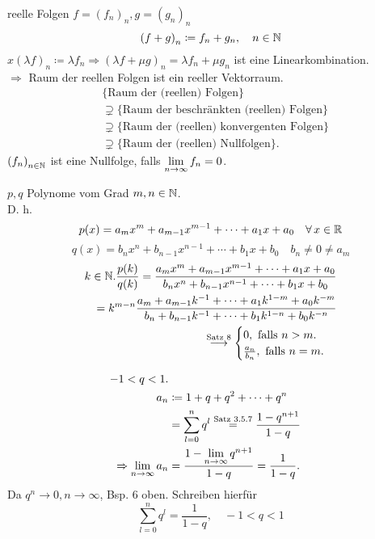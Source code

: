 \documentclass[../ana1.tex]{subfiles}
\begin{document}
reelle Folgen \(f = {(f_n)}_n, g = {(g_n)}_n \) \\
\[ {(f+g)}_n \coloneqq f_n + g_n, \quad n\in\mathbb{N} \]
\(x {(\lambda f)}_n \coloneqq \lambda f_n \Rightarrow {(\lambda f + \mu g)}_n = \lambda f_n + \mu g_n \) ist eine Linearkombination.\\
\(\Rightarrow{} \) Raum der reellen Folgen ist ein reeller Vektorraum.
\begin{align*}
	&\{ \text{Raum der (reellen) Folgen} \} \\
	&\supsetneq \{ \text{Raum der beschränkten (reellen) Folgen} \} \\
	&\supsetneq \{ \text{Raum der (reellen) konvergenten Folgen} \} \\
	&\supsetneq \{ \text{Raum der (reellen) Nullfolgen} \}.
\end{align*}
\({(f_n)}_{n\in\mathbb{N}} \) ist eine Nullfolge, falls \( \lim\limits_{n\rightarrow\infty} f_n = 0 \).

\begin{bsp}[1]
	\( p,q \) Polynome vom Grad \(m,n\in\mathbb{N} \).\\
	D. h. \[ p(x) = a_m x^m + a_{m-1} x^{m-1} + \cdots + a_1 x + a_0 \quad \forall x\in\R \]
	\[q(x) = b_n x^n + b_{n-1} x^{n-1} + \cdots + b_1 x + b_0 \quad b_n \neq 0 \neq a_m \]
	\begin{align*}
		k\in\mathbb{N}. \frac{p(k)}{q(k)} = \frac{a_m x^m + a_{m-1} x^{m-1} + \cdots + a_1 x + a_0}{b_n x^n + b_{n-1} x^{n-1} + \cdots + b_1 x + b_0}\\
		= k^{m-n} \frac{a_m + a_{m-1} k^{-1} + \cdots + a_1 k^{1-m} + a_0 k^{-m} }{b_n + b_{n-1} k^{-1} + \cdots + b_1 k^{1-n} + b_0 k^{-n}}\\
		\overset{\text{Satz 8}}{\longrightarrow}
		\begin{cases}
			0, \text{ falls } n>m.\\
			\frac{a_n}{b_n}, \text{ falls } n = m.
		\end{cases}
	\end{align*}
\end{bsp}

\begin{bsp}
	\begin{align*}
		-1<q<1.\\
		a_n &\coloneqq 1 + q + q^2 + \cdots + q^n\\
		&= \sum_{l=0}^{n} q^l \overset{\text{Satz 3.5.7}}{=} \frac{1-q^{n+1}}{1-q}\\
		\Rightarrow \lim\limits_{n\rightarrow\infty} a_n &= \frac{1- \lim\limits_{n\rightarrow\infty} q^{n+1}}{1-q} = \frac{1}{1-q}.
	\end{align*}
	Da \(q^n \rightarrow 0, n\rightarrow\infty \), Bsp. 6 oben.
	Schreiben hierfür \[ \sum_{l=0}^{n} q^l = \frac{1}{1-q}, \quad -1<q<1 \]
\end{bsp}
\end{document}
